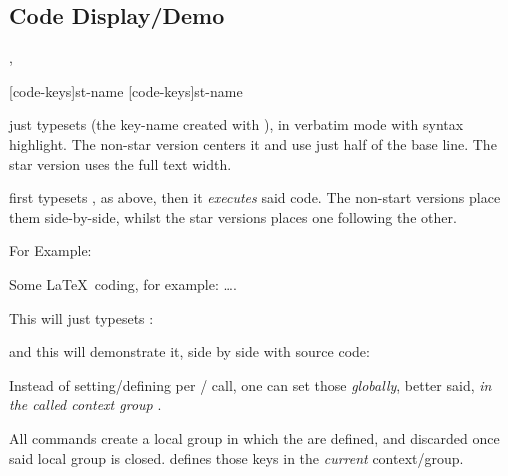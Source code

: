 \documentclass{article}
\begin{document}
\subsection{Code Display/Demo}
\begin{codedescribe}{\tscode*,\tsdemo*}
	\begin{codesyntax}%
		\tsmacro{\tscode*}[code-keys]{st-name}
		\tsmacro{\tsdemo*}[code-keys]{st-name}
	\end{codesyntax}
\tsmacro{\tscode}{} just typesets  (the key-name created with ), in verbatim mode with syntax highlight. The non-star version centers it and use just half of the base line. The star version uses the full text width.

\tsmacro{\tsdemo*}{} first typesets , as above, then it \emph{executes} said code. The non-start versions place them side-by-side, whilst the star versions places one following the other.
\end{codedescribe}


For Example:

\begin{codestore}[st=democodestore]
	\begin{codestore}[stmeta]
		Some \LaTeX~coding, for example: \ldots.
  \end{codestore}
  
This will just typesets :


and this will demonstrate it, side by side with source code:

\end{codestore}


\begin{codedescribe}{\setcodekeys}
	\begin{codesyntax}%
		\tsmacro{\setcodekeys}{code-keys}
	\end{codesyntax}

Instead of setting/defining  per \tsmacro{\tscode}{}/\tsmacro{\tsdemo}{} call, one can set those \emph{globally}, better said, \emph{in the called context group} .\\
\begin{tsremark}[N.B.:]
All \tsobj[code]{\tscode,\tsdemo} commands create a local group  in which the  are defined, and discarded once said local group is closed. \tsmacro{\setcodekeys}{} defines those keys in the \emph{current} context/group.
\end{tsremark}
\end{codedescribe}
\end{document}
